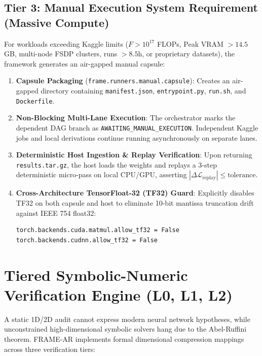\documentclass[11pt,a4paper]{article}
\begin{document}
\subsection{Tier 3: Manual Execution System Requirement (Massive Compute)}
For workloads exceeding Kaggle limits ($F > 10^{17}$ FLOPs, Peak VRAM $> 14.5$ GB, multi-node FSDP clusters, runs $> 8.5$h, or proprietary datasets), the framework generates an air-gapped manual capsule:
\begin{enumerate}[noitemsep]
    \item \textbf{Capsule Packaging} (\texttt{frame.runners.manual.capsule}): Creates an air-gapped directory containing \texttt{manifest.json}, \texttt{entrypoint.py}, \texttt{run.sh}, and \texttt{Dockerfile}.
    \item \textbf{Non-Blocking Multi-Lane Execution}: The orchestrator marks the dependent DAG branch as \texttt{AWAITING\_MANUAL\_EXECUTION}. Independent Kaggle jobs and local derivations continue running asynchronously on separate lanes.
    \item \textbf{Deterministic Host Ingestion \& Replay Verification}: Upon returning \texttt{results.tar.gz}, the host loads the weights and replays a 3-step deterministic micro-pass on local CPU/GPU, asserting $|\Delta \mathcal{L}_{\text{replay}}| \le \text{tolerance}$.
    \item \textbf{Cross-Architecture TensorFloat-32 (TF32) Guard}: Explicitly disables TF32 on both capsule and host to eliminate 10-bit mantissa truncation drift against IEEE 754 float32:
    \begin{verbatim}
torch.backends.cuda.matmul.allow_tf32 = False
torch.backends.cudnn.allow_tf32 = False
    \end{verbatim}
\end{enumerate}

\section{Tiered Symbolic-Numeric Verification Engine (L0, L1, L2)}

A static 1D/2D audit cannot express modern neural network hypotheses, while unconstrained high-dimensional symbolic solvers hang due to the Abel-Ruffini theorem. FRAME-AR implements formal dimensional compression mappings across three verification tiers:
\end{document}
